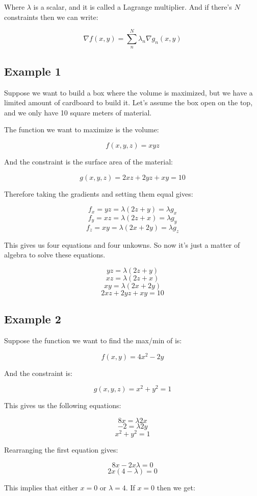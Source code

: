 \documentclass{article}
\begin{document}
Where $\lambda$ is a scalar, and it is called a Lagrange multiplier.  And if there's $N$ constraints then we can write:

$$\nabla f( x, y ) = \sum_n^N \lambda_n \nabla g_n( x, y )$$

%
%	
%
\subsection{Example 1}

Suppose we want to build a box where the volume is maximized, but we have a limited amount of cardboard to build it.  Let's assume the box open on the top, and we only have 10 square meters of material.

The function we want to maximize is the volume:

$$f( x, y, z ) = xyz$$

And the constraint is the surface area of the material:

$$g( x, y, z ) = 2xz + 2yz + xy = 10$$

Therefore taking the gradients and setting them equal gives:

$$f_x = yz = \lambda ( 2z + y ) = \lambda g_x$$
$$f_y = xz = \lambda ( 2z + x ) =\lambda g_y$$
$$f_z = xy = \lambda ( 2x + 2y ) =\lambda g_z$$

This gives us four equations and four unkowns.  So now it's just a matter of algebra to solve these equations.

$$yz = \lambda ( 2z + y )$$
$$xz = \lambda ( 2z + x )$$
$$xy = \lambda ( 2x + 2y )$$
$$2xz + 2yz + xy = 10$$

%
%	
%
\subsection{Example 2}

Suppose the function we want to find the max/min of is:

$$f( x, y ) = 4x^2 - 2y$$

And the constraint is:

$$g( x, y, z ) = x^2 + y^2 = 1$$

This gives us the following equations:

$$8x = \lambda 2x$$
$$-2 = \lambda 2y$$
$$x^2 + y^2 = 1$$

Rearranging the first equation gives:

$$8x - 2x \lambda = 0$$
$$2x( 4 - \lambda ) = 0$$

This implies that either $x=0$ or $\lambda=4$.  If $x=0$ then we get:
\end{document}

